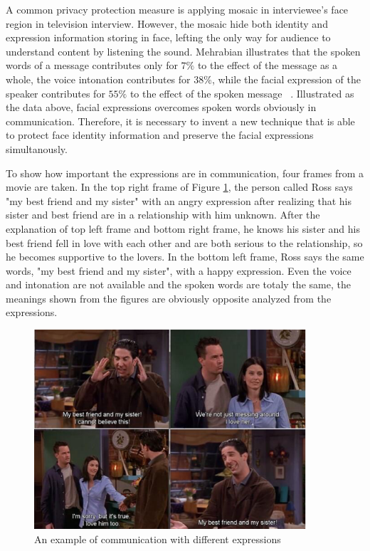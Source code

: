 \par
A common privacy protection measure is applying mosaic in interviewee's face region in television interview. 
However, the mosaic hide both identity and expression information storing in face, lefting the only way for audience to understand content by listening the sound. Mehrabian illustrates that the spoken words of a message contributes only for $7\%$ to the effect of the message as a whole, the voice intonation contributes for $38\%$, while the facial expression of the speaker contributes for $55\%$ to the effect of the spoken message ~\cite{Meh68}. Illustrated as the data above, facial expressions overcomes spoken words obviously in communication. Therefore, it is necessary to invent a new technique that is able to protect face identity information and preserve the facial expressions simultanously. 

\par
To show how important the expressions are in communication, four frames from a movie are taken. In the top right frame of Figure \ref{expression}, the person called Ross says "my best friend and my sister" with an angry expression after realizing that his sister and best friend are in a relationship with him unknown. After the explanation of top left frame and bottom right frame, he knows his sister and his best friend fell in love with each other and are both serious to the relationship, so he becomes supportive to the lovers. In the bottom left frame, Ross says the same words, "my best friend and my sister", with a happy expression. Even the voice and intonation are not available and the spoken words are totaly the same, the meanings shown from the figures are obviously opposite analyzed from the expressions. 
\begin{figure}
  \centering
  \includegraphics[width=0.9\textwidth]{figure/sisFri.png} 
  \caption{An example of communication with different expressions}
  \label{expression}
\end{figure}

